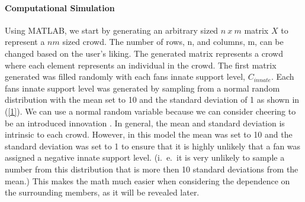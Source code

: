 \documentclass[oneside,12pt]{report}
\begin{document}
%

\paragraph {Computational Simulation} \newline

Using MATLAB, we start by generating an arbitrary sized $n~x~m$ matrix $X$ to represent a $nm$ sized crowd. The number of rows, n, and columns, m, can be changed based on the user's liking. The generated matrix represents a crowd where each element represents an individual in the crowd. The first matrix generated was filled randomly with  each fans innate support level, $C_{innate}$. Each fans innate support level was generated by sampling from a normal random distribution with the mean set to 10 and the standard deviation of 1 as shown in (\ref{1}). We can use a normal random variable because we can consider cheering to be an introduced innovation \cite{DI2003}. In general, the mean and standard deviation is intrinsic to each crowd. However, in this model the mean was set to 10 and the standard deviation was set to 1 to ensure that it is highly unlikely that a fan was assigned a negative innate support level. (i.~e.~it is very unlikely to sample a number from this distribution that is more then 10 standard deviations from the mean.) This makes the math much easier when considering the dependence on the surrounding members, as it will be revealed later.
\end{document}
